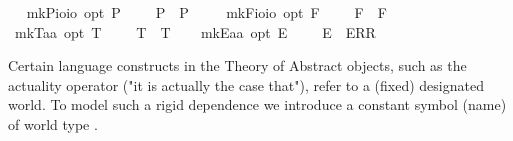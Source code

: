 \begin{isabellebody}
\isamarkuptrue%
\ \isamarkupfalse%
\ mkP{\isacharcolon}{\isacharcolon}{\isachardoublequoteopen}io{\isasymRightarrow}io\ opt{\isachardoublequoteclose}\ {\isacharparenleft}{\isachardoublequoteopen}{\isacharunderscore}\isactrlsup P{\isachardoublequoteclose}\ {\isacharbrackleft}{}{}{}{\isacharbrackright}\ {}{}{}{\isacharparenright}\ \ \ {\isachardoublequoteopen}{\isasymphi}\isactrlsup P\ {\isasymequiv}\ P\ {\isasymphi}{\isachardoublequoteclose}\ \isanewline
\ \isamarkupfalse%
\ mkF{\isacharcolon}{\isacharcolon}{\isachardoublequoteopen}io{\isasymRightarrow}io\ opt{\isachardoublequoteclose}\ {\isacharparenleft}{\isachardoublequoteopen}{\isacharunderscore}\isactrlsup F{\isachardoublequoteclose}\ {\isacharbrackleft}{}{}{}{\isacharbrackright}\ {}{}{}{\isacharparenright}\ \ \ {\isachardoublequoteopen}{\isasymphi}\isactrlsup F\ {\isasymequiv}\ F\ {\isasymphi}{\isachardoublequoteclose}\ \isanewline
\ \isamarkupfalse%
\ mkT{\isacharcolon}{\isacharcolon}{\isachardoublequoteopen}{\isacharprime}a{\isasymRightarrow}{\isacharprime}a\ opt{\isachardoublequoteclose}\ {\isacharparenleft}{\isachardoublequoteopen}{\isacharunderscore}\isactrlsup T{\isachardoublequoteclose}\ {\isacharbrackleft}{}{}{}{\isacharbrackright}\ {}{}{}{\isacharparenright}\ \ \ {\isachardoublequoteopen}{\isasymphi}\isactrlsup T\ {\isasymequiv}\ T\ {\isasymphi}{\isachardoublequoteclose}\isanewline
\ \isamarkupfalse%
\ mkE{\isacharcolon}{\isacharcolon}{\isachardoublequoteopen}{\isacharprime}a{\isasymRightarrow}{\isacharprime}a\ opt{\isachardoublequoteclose}\ {\isacharparenleft}{\isachardoublequoteopen}{\isacharunderscore}\isactrlsup E{\isachardoublequoteclose}\ {\isacharbrackleft}{}{}{}{\isacharbrackright}\ {}{}{}{\isacharparenright}\ \ \ {\isachardoublequoteopen}{\isasymphi}\isactrlsup E\ {\isasymequiv}\ ERR\ {\isasymphi}{\isachardoublequoteclose}%
\begin{isamarkuptext}%
Certain language constructs in the Theory of Abstract objects, such as the actuality operator  
  \isa{\isactrlbold {\isasymA}} ("it is actually the case that"), refer to a (fixed) designated world. To model such a 
  rigid dependence we introduce a constant symbol (name)  of world type . 

\end{isamarkuptext}
\end{isabellebody}
